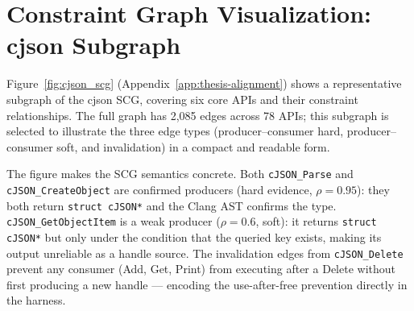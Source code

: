 \section{Constraint Graph Visualization: cjson Subgraph}
\label{sec:eval_cg_figure}

Figure~\ref{fig:cjson_scg} (Appendix~\ref{app:thesis-alignment}) shows a representative subgraph of the cjson SCG, covering six core APIs and their constraint relationships. The full graph has 2,085 edges across 78 APIs; this subgraph is selected to illustrate the three edge types (producer--consumer hard, producer--consumer soft, and invalidation) in a compact and readable form.

The figure makes the SCG semantics concrete. Both \texttt{cJSON\_Parse} and \texttt{cJSON\_CreateObject} are confirmed producers (hard evidence, $\rho = 0.95$): they both return \texttt{struct cJSON*} and the Clang AST confirms the type. \texttt{cJSON\_GetObjectItem} is a weak producer ($\rho = 0.6$, soft): it returns \texttt{struct cJSON*} but only under the condition that the queried key exists, making its output unreliable as a handle source. The invalidation edges from \texttt{cJSON\_Delete} prevent any consumer (Add, Get, Print) from executing after a Delete without first producing a new handle — encoding the use-after-free prevention directly in the harness.
